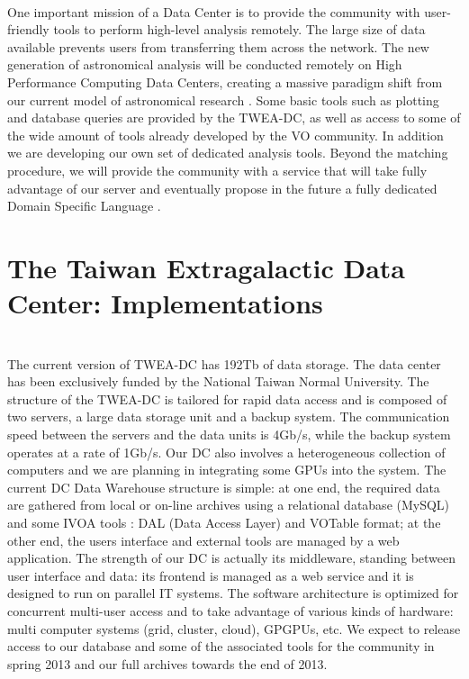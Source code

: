 \\
One important mission of a Data Center is to provide the community with user-friendly tools to perform high-level analysis remotely. The large size of data available prevents users from transferring them across the network. The new generation of astronomical analysis will be conducted remotely on High Performance Computing Data Centers, creating a massive paradigm shift from our current model of astronomical research \citep[the {\it Fourth Paradigm} -][]{fourthpar}.
Some basic tools such as plotting and database queries are provided by the TWEA-DC, as well as access to some of the wide amount of tools already developed by the VO community. In addition we are developing our own set of dedicated analysis tools. Beyond the matching procedure, we will provide the community with a service that will take fully advantage of our server and eventually propose in the future a fully dedicated Domain Specific Language \citep{O18_adassxxii}.

\section{The Taiwan Extragalactic Data Center: Implementations}

\\
The current version of TWEA-DC has 192Tb of data storage. The data center has been exclusively funded by the National Taiwan Normal University.  The structure of the TWEA-DC is tailored for rapid data access and is composed of two servers, a large data storage unit and a backup system. The communication speed between the servers and the data units is 4Gb/s, while the backup system operates at a rate of 1Gb/s. Our DC also involves a heterogeneous collection of computers and we are planning in integrating some GPUs into the system. The current DC Data Warehouse structure is simple: at one end, the required data are gathered from local or on-line archives using a relational database (MySQL) and some IVOA tools : DAL (Data Access Layer) and VOTable format; at the other end, the users interface and external tools are managed by a web application. The strength of our DC is actually its middleware, standing between user interface and data: its frontend is managed as a web service and it is designed to run on parallel IT systems. The software architecture is optimized for concurrent multi-user access and to take advantage of various kinds of hardware: multi computer systems (grid, cluster, cloud), GPGPUs, etc.
We expect to release access to our database and some of the associated tools for the community in spring 2013 and our full archives towards the end of 2013.\\

